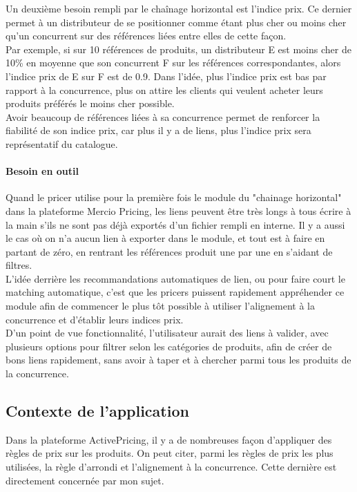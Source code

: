 \documentclass{rapportCS}
\begin{document}
Un deuxième besoin rempli par le chaînage horizontal est l'indice prix. Ce dernier permet à un distributeur
de se positionner comme étant plus cher ou moins cher qu'un concurrent sur des références liées entre elles
de cette façon. \\ 
Par exemple, si sur 10 références de produits, un distributeur E est moins cher de 10\%
en moyenne que son concurrent F sur les références correspondantes, alors l'indice prix de E sur F est
de 0.9. Dans l'idée, plus l'indice prix est bas par rapport à la concurrence, plus on attire les clients
qui veulent acheter leurs produits préférés le moins cher possible.\\
Avoir beaucoup de références liées à sa concurrence permet de renforcer la fiabilité de son indice prix,
car plus il y a de liens, plus l'indice prix sera représentatif du catalogue.

\paragraph{Besoin en outil}
Quand le pricer utilise pour la première fois le module du "chainage horizontal" dans la plateforme
Mercio Pricing, les liens peuvent être très longs à tous écrire à la 
main s'ils ne sont pas déjà exportés d'un fichier rempli en interne.
Il y a aussi le cas où on n'a aucun lien à exporter dans le module, et tout est à
faire en partant de zéro, en rentrant les références produit une par une en s'aidant de filtres.\\

L'idée derrière les recommandations automatiques de lien, ou pour faire court le matching automatique,
c'est que les pricers puissent rapidement appréhender ce module afin de commencer le plus tôt possible 
à utiliser l'alignement à la concurrence et d'établir leurs indices prix.\\
D'un point de vue fonctionnalité, l'utilisateur aurait des liens à valider, 
avec plusieurs options pour filtrer selon les catégories de produits, afin de créer de bons liens
rapidement, sans avoir à taper et à chercher parmi tous les produits de la concurrence.\\


\subsection{Contexte de l'application}
Dans la plateforme ActivePricing, il y a de nombreuses façon d'appliquer des règles de prix sur les 
produits. On peut citer, parmi les règles de prix les plus utilisées, la règle d'arrondi et l'alignement 
à la concurrence. Cette dernière est directement concernée par mon sujet.\\
\end{document}
